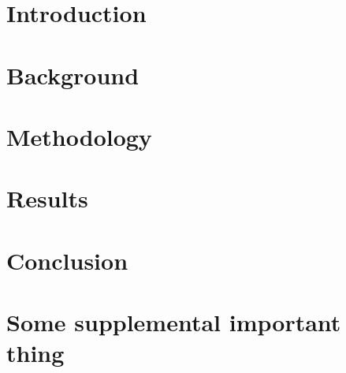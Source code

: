 \documentclass[12pt,english]{report}
\begin{document}
\titlespacing*{\chapter}{0pt}{50pt}{40pt}

\chapter{Introduction} \label{c:intro}
    

\chapter{Background} \label{c:background}
    

\chapter{Methodology} \label{c:method}
    

\chapter{Results} \label{c:res}
    

\chapter{Conclusion} \label{c:conclusion}
    

\begin{onehalfspace}
\setlength{}
\printbibliography[heading=bibintoc]
\end{onehalfspace}

\appendix
\chapter{Some supplemental important thing} \label{c:conclusion}
    
\end{document}
